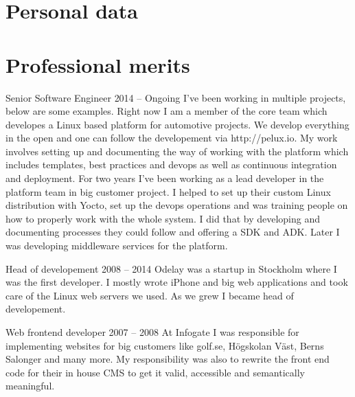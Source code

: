 \documentclass{twocolcv}
\begin{document}
\section*{Personal data}
\section*{Professional merits}
           {Senior Software Engineer}
           {2014 -- Ongoing}
           {
I've been working in multiple projects, below are some examples.\newline\newline
{}
        {Right now I am a member of the core team which developes a Linux based platform for automotive projects. We develop everything in the open and one can follow the developement via http://pelux.io. My work involves setting up and documenting the way of working with the platform which includes templates, best practices and devops as well as continuous integration and deployment.}
        {For two years I've been working as a lead developer in the platform team in big customer project. I helped to set up their custom Linux distribution with Yocto, set up the devops operations and was training people on how to properly work with the whole system. I did that by developing and documenting processes they could follow and offering a SDK and ADK. Later I was developing middleware services for the platform.}
}

     {Head of developement}
     {2008 -- 2014}
     {Odelay was a startup in Stockholm where I was the first developer. I mostly wrote iPhone and big web applications and took care of the Linux web servers we used. As we grew I became head of developement.}

     {Web frontend developer}
     {2007 -- 2008}
     {At Infogate I was responsible for implementing websites for big customers like golf.se, Högskolan Väst, Berns Salonger and many more. My responsibility was also to rewrite the front end code for their in house CMS to get it valid, accessible and semantically meaningful.}
\end{document}
